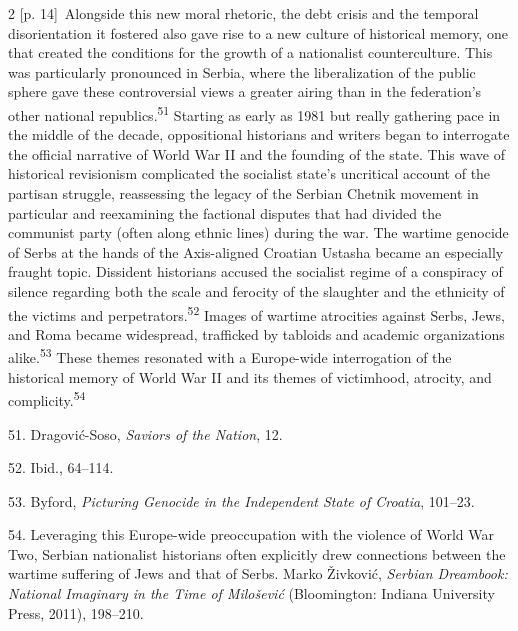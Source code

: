 \documentclass[10pt,a4paper]{article}
\begin{document}
\begin{paracol}{2}
\switchcolumn
{\scriptsize\color{gray} [p. 14]}\ Alongside this new moral rhetoric, the debt crisis and the temporal disorientation it fostered also gave rise to a new culture of historical memory, one that created the conditions for the growth of a nationalist counterculture. This was particularly pronounced in Serbia, where the liberalization of the public sphere gave these controversial views a greater airing than in the federation’s other national republics.\nobreak\textsuperscript{51} Starting as early as 1981 but really gathering pace in the middle of the decade, oppositional historians and writers began to interrogate the official narrative of World War II and the founding of the state. This wave of historical revisionism complicated the socialist state’s uncritical account of the partisan struggle, reassessing the legacy of the Serbian Chetnik movement in particular and reexamining the factional disputes that had divided the communist party (often along ethnic lines) during the war. The wartime genocide of Serbs at the hands of the Axis-aligned Croatian Ustasha became an especially fraught topic. Dissident historians accused the socialist regime of a conspiracy of silence regarding both the scale and ferocity of the slaughter and the ethnicity of the victims and perpetrators.\nobreak\textsuperscript{52} Images of wartime atrocities against Serbs, Jews, and Roma became widespread, trafficked by tabloids and academic organizations alike.\nobreak\textsuperscript{53} These themes resonated with a Europe-wide interrogation of the historical memory of World War II and its themes of victimhood, atrocity, and complicity.\nobreak\textsuperscript{54}\par{\small 51. Dragović-Soso, \textit{Saviors of the Nation}, 12.\par}{\small 52. Ibid., 64–114.\par}{\small 53. Byford, \textit{Picturing Genocide in the Independent State of Croatia}, 101–23.\par}{\small 54. Leveraging this Europe-wide preoccupation with the violence of World War Two, Serbian nationalist historians often explicitly drew connections between the wartime suffering of Jews and that of Serbs. Marko Živković, \textit{Serbian Dreambook: National Imaginary in the Time of Milošević} (Bloomington: Indiana University Press, 2011), 198–210.\par}
\switchcolumn*

\end{paracol}
\end{document}

